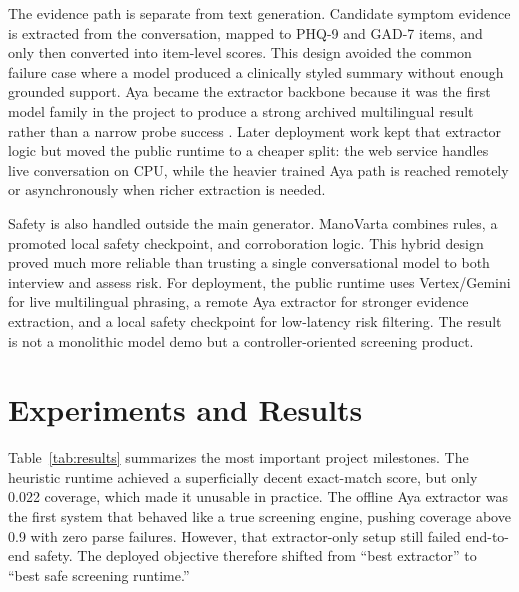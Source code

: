 \documentclass[11pt]{article}
\begin{document}
The evidence path is separate from text generation. Candidate symptom evidence is extracted from the conversation, mapped to PHQ-9 and GAD-7 items, and only then converted into item-level scores. This design avoided the common failure case where a model produced a clinically styled summary without enough grounded support. Aya became the extractor backbone because it was the first model family in the project to produce a strong archived multilingual result rather than a narrow probe success \citep{cohere2024aya}. Later deployment work kept that extractor logic but moved the public runtime to a cheaper split: the web service handles live conversation on CPU, while the heavier trained Aya path is reached remotely or asynchronously when richer extraction is needed.

Safety is also handled outside the main generator. ManoVarta combines rules, a promoted local safety checkpoint, and corroboration logic. This hybrid design proved much more reliable than trusting a single conversational model to both interview and assess risk. For deployment, the public runtime uses Vertex/Gemini for live multilingual phrasing, a remote Aya extractor for stronger evidence extraction, and a local safety checkpoint for low-latency risk filtering. The result is not a monolithic model demo but a controller-oriented screening product.

\section{Experiments and Results}
Table~\ref{tab:results} summarizes the most important project milestones. The heuristic runtime achieved a superficially decent exact-match score, but only 0.022 coverage, which made it unusable in practice. The offline Aya extractor was the first system that behaved like a true screening engine, pushing coverage above 0.9 with zero parse failures. However, that extractor-only setup still failed end-to-end safety. The deployed objective therefore shifted from ``best extractor'' to ``best safe screening runtime.''
\end{document}
